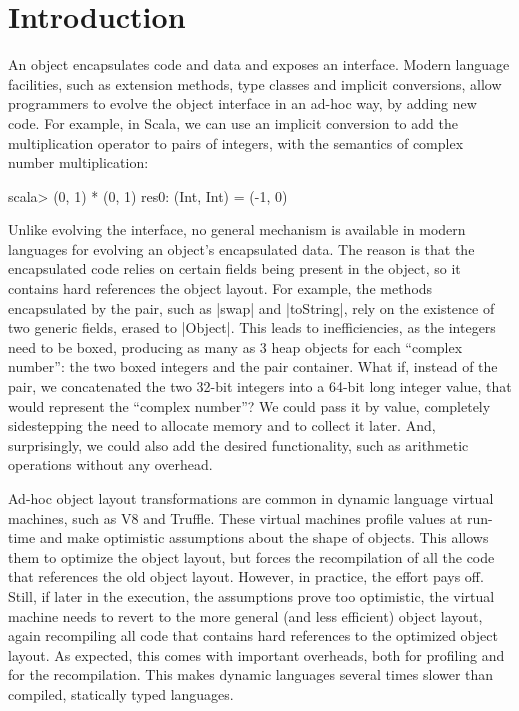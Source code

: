 \section{Introduction}
\label{sec:intro}

An object encapsulates code and data and exposes an interface. Modern
language facilities, such as extension methods, type classes and
implicit conversions, allow programmers to evolve the object interface
in an ad-hoc way, by adding new code. For example, in Scala, we can
use an implicit conversion to add the multiplication operator to pairs
of integers, with the semantics of complex number multiplication:

\begin{lstlisting-nobreak}
scala> (0, 1) * (0, 1)
res0: (Int, Int) = (-1, 0)
\end{lstlisting-nobreak}

Unlike evolving the interface, no general mechanism is available in
modern languages for evolving an object's encapsulated data. The
reason is that the encapsulated code relies on certain fields being
present in the object, so it contains hard references the object
layout. For example, the methods encapsulated by the pair, such as
|swap| and |toString|, rely on the existence of two generic fields,
erased to |Object|. This leads to inefficiencies, as the integers need
to be boxed, producing as many as 3 heap objects for each ``complex
number'': the two boxed integers and the pair container. What if,
instead of the pair, we concatenated the two 32-bit integers into a
64-bit long integer value, that would represent the ``complex
number''? We could pass it by value, completely sidestepping the need
to allocate memory and to collect it later. And, surprisingly, we
could also add the desired functionality, such as arithmetic
operations without any overhead.

Ad-hoc object layout transformations are common in dynamic language virtual machines, such as V8 and Truffle. These virtual machines profile values at run-time and make optimistic assumptions about the shape of objects. This allows them to optimize the object layout, but forces the recompilation of all the code that references the old object layout. However, in practice, the effort pays off. Still, if later in the execution, the assumptions prove too optimistic, the virtual machine needs to revert to the more general (and less efficient) object layout, again recompiling all code that contains hard references to the optimized object layout. As expected, this comes with important overheads, both for profiling and for the recompilation. This makes dynamic languages several times slower than compiled, statically typed languages.

